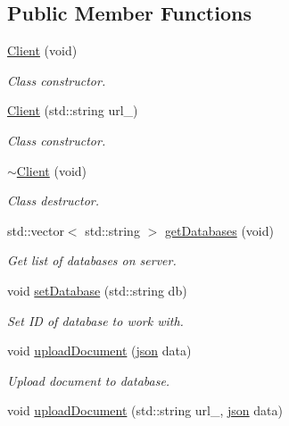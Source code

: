 \subsection*{Public Member Functions}
\begin{DoxyCompactItemize}
\item 
\hyperlink{class_client_adc081e1006b31b0e5ded80c71e3ada70}{Client} (void)
\begin{DoxyCompactList}\small\item\em Class constructor. \end{DoxyCompactList}\item 
\hyperlink{class_client_a8e19879cb7c39c111b523ed216273203}{Client} (std\+::string url\+\_\+)
\begin{DoxyCompactList}\small\item\em Class constructor. \end{DoxyCompactList}\item 
\hyperlink{class_client_a66e3074e5f09c5e9bb4ec36bdea01c91}{$\sim$\+Client} (void)
\begin{DoxyCompactList}\small\item\em Class destructor. \end{DoxyCompactList}\item 
std\+::vector$<$ std\+::string $>$ \hyperlink{class_client_a19ad3503375f64a4b68e20dbc98703c4}{get\+Databases} (void)
\begin{DoxyCompactList}\small\item\em Get list of databases on server. \end{DoxyCompactList}\item 
void \hyperlink{class_client_a6481994d5e2711bf43bca04460cb2316}{set\+Database} (std\+::string db)
\begin{DoxyCompactList}\small\item\em Set ID of database to work with. \end{DoxyCompactList}\item 
void \hyperlink{class_client_ae9c82ded3834b156fb98e16bdac2a05f}{upload\+Document} (\hyperlink{_couch_d_b_8hpp_ab701e3ac61a85b337ec5c1abaad6742d}{json} data)
\begin{DoxyCompactList}\small\item\em Upload document to database. \end{DoxyCompactList}\item 
void \hyperlink{class_client_ad6e6281bbd3cba141664bf2c0ac87227}{upload\+Document} (std\+::string url\+\_\+, \hyperlink{_couch_d_b_8hpp_ab701e3ac61a85b337ec5c1abaad6742d}{json} data)

\end{DoxyCompactItemize}
